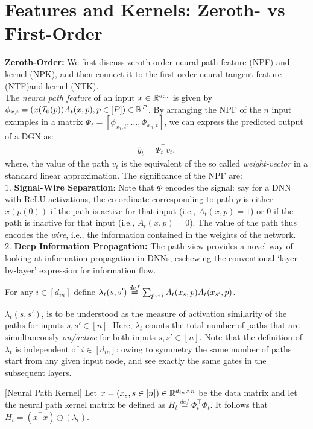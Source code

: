 \section{Features and Kernels: Zeroth- vs First-Order}\label{sec:expressivity}
\textbf{Zeroth-Order:} We first discuss zeroth-order neural path feature (NPF) and kernel (NPK), and then connect it to the first-order neural tangent feature  (NTF)and kernel (NTK).\hfill\\
The \emph{neural path feature} of an input $x\in \mathbb{R}^{d_{in}}$ is given by $\phi_{x,t}=(x(\mathcal{I}_0(p))A_t(x,p) ,p\in[P])\in\mathbb{R}^P$. By arranging the NPF of the $n$ input examples in a matrix $\Phi_t=\left[\phi_{x_1,t},\ldots, \Phi_{x_n,t}\right]$, we can express the predicted output of a DGN as: \begin{align}\label{eq:npfbasic}\hat{y}_t=\Phi_t^\top v_t,\end{align}
where, the value of the path $v_t$ is the equivalent of the so called \emph{weight-vector} in a standard linear approximation. The significance of the NPF are:\hfill\\
$1.$ \textbf{Signal-Wire Separation}: Note that $\Phi$ encodes the signal: say for a DNN with ReLU activations, the co-ordinate corresponding to path $p$ is either $x(p(0))$ if the path is active for that input (i.e., $A_t(x,p)=1$) or $0$ if the path is inactive for that input  (i.e., $A_t(x,p)=0$). The value of the path thus encodes the \emph{wire}, i.e., the information contained in the weights of the network. \hfill\\
$2.$ \textbf{Deep Information Propagation:} The path view provides a novel way of looking at information propagation in DNNs, eschewing the conventional `layer-by-layer' expression for information flow.\hfill\\
\begin{definition}\label{def:lambda}
 For any $i\in [d_{in}]$ define $\lambda_t(s,s')\stackrel{def}{=}\sum_{p\rightsquigarrow i} A_t(x_s,p) A_t(x_{s'},p)$.
 \end{definition} 
$\lambda_t(s,s')$, is to be understood as the measure of activation similarity of the paths for inputs $s,s'\in[n]$. Here, $\lambda_t$ counts the total number of paths that are simultaneously \emph{on/active} for both inputs $s,s'\in[n]$. Note that the definition of $\lambda_t$ is independent of $i\in [d_{in}]$: owing to symmetry the same number of paths start from any given input node, and see exactly the same gates in the subsequent layers.
\begin{lemma}\label{lm:npk}[Neural Path Kernel] Let $x=(x_s,s\in [n])\in\mathbb{R}^{d_{in}\times n}$ be the data matrix and let the neural path kernel matrix be defined as $H_t\stackrel{def}=\Phi^\top_t\Phi_t$. It follows that $H_t= (x^\top x)\odot(\lambda_t)$. \end{lemma}
